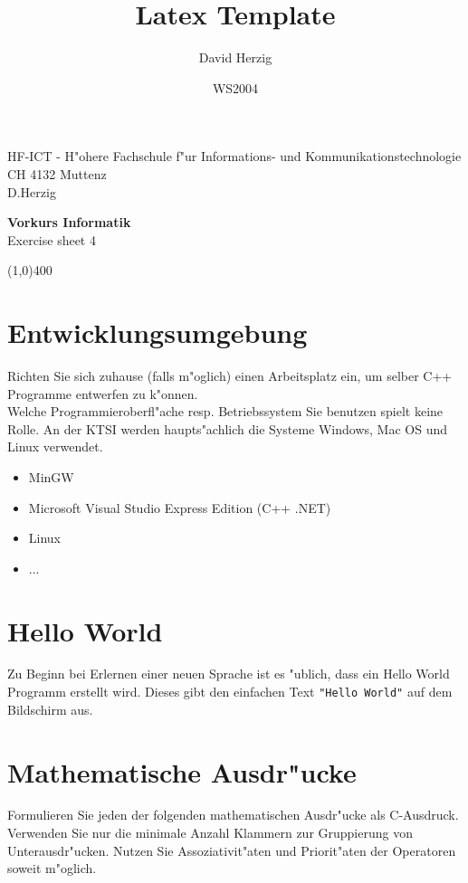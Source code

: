 \documentclass[a4paper,10pt]{article}
\title{Latex Template}
\author{David Herzig}
\date{WS2004}
\begin{document}
HF-ICT - H"ohere Fachschule f"ur Informations- und Kommunikationstechnologie\\
CH 4132 Muttenz\\
D.Herzig

\vspace{2mm}

\begin{center}
{\Large \bf Vorkurs Informatik}\\
Exercise sheet 4
\end{center}

\vspace{2mm}

\line(1,0){400}

\vspace{5mm}

\section{Entwicklungsumgebung}
Richten Sie sich zuhause (falls m"oglich) einen Arbeitsplatz ein, um selber C++ Programme entwerfen zu k"onnen.\\
Welche Programmieroberfl"ache resp. Betriebssystem Sie benutzen spielt keine Rolle. An der KTSI werden haupts"achlich
die Systeme Windows, Mac OS und Linux verwendet.

\begin{itemize}
\item MinGW
\item Microsoft Visual Studio Express Edition (C++ .NET)
\item Linux
\item ...
\end{itemize}

\section{Hello World}
Zu Beginn bei Erlernen einer neuen Sprache ist es "ublich, dass ein Hello World Programm erstellt wird. Dieses gibt den einfachen Text \verb|"Hello World"| auf dem Bildschirm aus.

\section{Mathematische Ausdr"ucke}
Formulieren Sie jeden der folgenden mathematischen Ausdr"ucke als
C-Ausdruck. Verwenden Sie nur die minimale Anzahl Klammern zur Gruppierung von
Unterausdr"ucken. Nutzen Sie Assoziativit"aten und Priorit"aten der Operatoren
soweit m"oglich.
\end{document}
